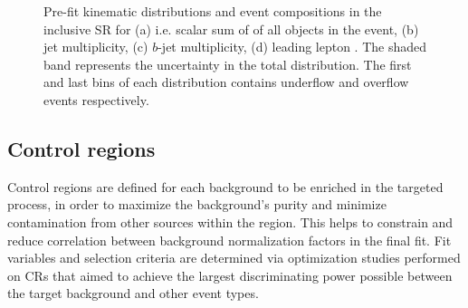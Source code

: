 \documentclass[../thesis.tex]{subfiles}
\begin{document}
\begin{figure}[!htb]
\caption{\label{fig:ana:signal_prefit}Pre-fit kinematic distributions and event compositions in the inclusive \acs{SR} for (a) \HT i.e. scalar sum of \pT of all objects in the event, (b) jet multiplicity, (c) $b$-jet multiplicity, (d) leading lepton \pT. The shaded band represents the uncertainty in the total distribution. The first and last bins of each distribution contains underflow and overflow events respectively.}
\end{figure}

\subsection{Control regions}
Control regions are defined for each background to be enriched in the targeted process, in order to maximize the background's purity and minimize contamination from other sources within the region. This helps to constrain and reduce correlation between background normalization factors in the final fit. Fit variables and selection criteria are determined via optimization studies performed on \acs{CR}s that aimed to achieve the largest discriminating power possible between the target background and other event types.
\end{document}
